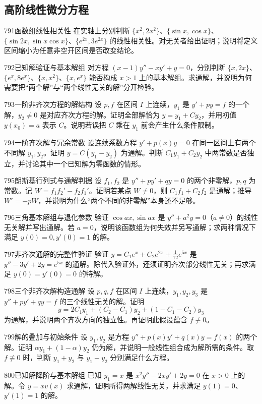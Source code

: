 \subsection{高阶线性微分方程}
\begin{exercise}{791}{函数组线性相关性}
在实轴上分别判断 $\{x^2,2x^2\}$、$\{\sin x,\cos x\}$、$\{\sin2x,\sin x\cos x\}$、$\{e^{2x},3e^{2x}\}$ 的线性相关性。对无关者给出证明；说明将定义区间缩小为任意非空开区间是否改变结论。
\end{exercise}
\begin{exercise}{792}{已知解验证与基本解组}
对方程 $(x-1)y''-xy'+y=0$，分别判断 $\{x,2x\}$、$\{e^x,8e^x\}$、$\{x,x^2\}$、$\{x,e^x\}$ 能否构成 $x>1$ 上的基本解组。求通解，并说明为何需要把“两个解”与“两个线性无关的解”分开检验。
\end{exercise}
\begin{exercise}{793}{一阶非齐次方程的解结构}
设 $p,f$ 在区间 $I$ 上连续，$y_1$ 是 $y'+py=f$ 的一个解，$y_2\ne0$ 是对应齐次方程的解。证明全部解恰为 $y=y_1+Cy_2$，并用初值 $y(x_0)=a$ 表示 $C$。说明若误把 $C$ 乘在 $y_1$ 前会产生什么条件限制。
\end{exercise}
\begin{exercise}{794}{一阶齐次解与冗余常数}
设连续系数方程 $y'+p(x)y=0$ 在同一区间上有两个不同解 $y_1,y_2$。证明 $y=C(y_1-y_2)$ 为通解。判断 $C_1y_1+C_2y_2$ 中两常数是否独立，并讨论其中一个已知解为零函数的情形。
\end{exercise}
\begin{exercise}{795}{朗斯基行列式与通解判据}
设 $f_1,f_2$ 是 $y''+py'+qy=0$ 的两个非零解，$p,q$ 为常数。记 $W=f_1f_2'-f_2f_1'$。证明若某点 $W\ne0$，则 $C_1f_1+C_2f_2$ 是通解；推导 $W'=-pW$，并说明为什么“两个不同的非零解”本身还不足够。
\end{exercise}
\begin{exercise}{796}{三角基本解组与退化参数}
验证 $\cos ax,\sin ax$ 是 $y''+a^2y=0$（$a\ne0$）的线性无关解并写出通解。若 $a=0$，说明该函数组为何失效并另写通解；求两种情况下满足 $y(0)=0,y'(0)=1$ 的解。
\end{exercise}
\begin{exercise}{797}{非齐次通解的完整性验证}
验证 $y=C_1e^x+C_2e^{2x}+\frac1{12}e^{5x}$ 是 $y''-3y'+2y=e^{5x}$ 的通解。除代入验证外，还须证明齐次部分线性无关；再求满足 $y(0)=y'(0)=0$ 的特解。
\end{exercise}
\begin{exercise}{798}{三个非齐次解构造通解}
设 $p,q,f$ 在区间 $I$ 上连续，$y_1,y_2,y_3$ 是 $y''+py'+qy=f$ 的三个线性无关的解。证明
\[
y=2C_1y_1+(C_2-C_1)y_2+(1-C_1-C_2)y_3
\]
为通解，并说明两个齐次方向的独立性。再证明此假设蕴含 $f\not\equiv0$。
\end{exercise}
\begin{exercise}{799}{解的叠加与初始条件}
设 $y_1,y_2$ 是方程 $y''+p(x)y'+q(x)y=f(x)$ 的两个解。证明 $\alpha y_1+(1-\alpha)y_2$ 仍为解，并说明一般线性组合成为解所需的条件。取 $f\not\equiv0$ 时，判断 $y_1+y_2$ 与 $y_1-y_2$ 分别满足什么方程。
\end{exercise}
\begin{exercise}{800}{已知解降阶与基本解组}
已知 $y_1=x$ 是 $x^2y''-2xy'+2y=0$ 在 $x>0$ 上的解。令 $y=xv(x)$ 求通解，证明所得两解线性无关，并求满足 $y(1)=0$、$y'(1)=1$ 的解。
\end{exercise}
